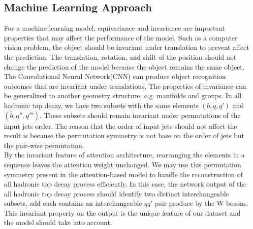 \subsection{Machine Learning Approach}\label{subsec:ML approach}
For a machine learning model, equivariance and invariance are important properties that may affect the performance of the model. Such as a computer vision problem, the object should be invariant under translation to prevent affect the prediction. The translation, rotation, and shift of the position should not change the prediction of the model because the object remains the same object. The Convolutional Neural Network(CNN) can produce object recognition outcomes that are invariant under translations. The properties of invariance can be generalized to another geometry structure, e.g. manifolds and groups. In all hadronic top decay, we have two subsets with the same elements $(b, q, q')$ and $(\bar{b}, q'', q''')$. These subsets should remain invariant under permutations of the input jets order. The reason that the order of input jets should not affect the result is because the permutation symmetry is not base on the order of jets but the pair-wise permutation.
\\
By the invariant feature of attention architecture, rearranging the elements in a sequence leaves the attention weight unchanged. We may use this permutation symmetry present in the attention-based model to handle the reconstruction of all hadronic top decay process efficiently. In this case, the network output of the all hadronic top decay process should identify two distinct interchangeable subsets, add each contains an interchangeable $qq'$ pair produce by the W bosons. This invariant property on the output is the unique feature of our dataset and the model should take into account. 
\\
